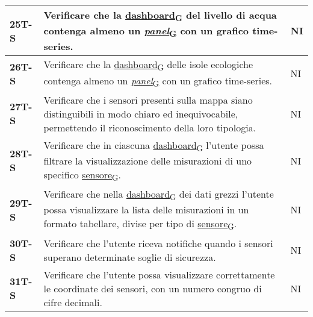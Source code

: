 \begin{longtable}{|>{\raggedright\arraybackslash}m{}|>{\raggedright\arraybackslash}m{}|>{\raggedright\arraybackslash}m{}|}
	\hline
	\textbf{25T-S}  & Verificare che la \href{https://7last.github.io/docs/pb/documentazione-interna/glossario\#dashboard}{dashboard\textsubscript{G}} del livello di acqua contenga almeno un \href{https://7last.github.io/docs/pb/documentazione-interna/glossario\#panel}{\textit{panel}\textsubscript{G}} con un grafico time-series.                                                                                   & NI             \\
	\hline
	\textbf{26T-S}  & Verificare che la \href{https://7last.github.io/docs/pb/documentazione-interna/glossario\#dashboard}{dashboard\textsubscript{G}} delle isole ecologiche contenga almeno un \href{https://7last.github.io/docs/pb/documentazione-interna/glossario\#panel}{\textit{panel}\textsubscript{G}} con un grafico time-series.                                                                                 & NI             \\
	\hline
	\textbf{27T-S}  & Verificare che i sensori presenti sulla mappa siano distinguibili in modo chiaro ed inequivocabile, permettendo il riconoscimento della loro tipologia.                                          & NI             \\
	\hline
	\textbf{28T-S}  & Verificare che in ciascuna \href{https://7last.github.io/docs/pb/documentazione-interna/glossario\#dashboard}{dashboard\textsubscript{G}} l’utente possa filtrare la visualizzazione delle misurazioni di uno specifico \href{https://7last.github.io/docs/pb/documentazione-interna/glossario\#sensore}{sensore\textsubscript{G}}.                                                                      & NI             \\
	\hline
	\textbf{29T-S}  & Verificare che nella \href{https://7last.github.io/docs/pb/documentazione-interna/glossario\#dashboard}{dashboard\textsubscript{G}} dei dati grezzi l’utente possa visualizzare la lista delle misurazioni in un formato tabellare, divise per tipo di \href{https://7last.github.io/docs/pb/documentazione-interna/glossario\#sensore}{sensore\textsubscript{G}}.                                       & NI             \\ %
	\hline
	\textbf{30T-S}  & Verificare che l’utente riceva notifiche quando i sensori superano determinate soglie di sicurezza.                                                                                          & NI             \\
	\hline
	\textbf{31T-S}  & Verificare che l’utente possa visualizzare correttamente le coordinate dei sensori, con un numero congruo di cifre decimali.                                                                     & NI             \\

\end{longtable}
